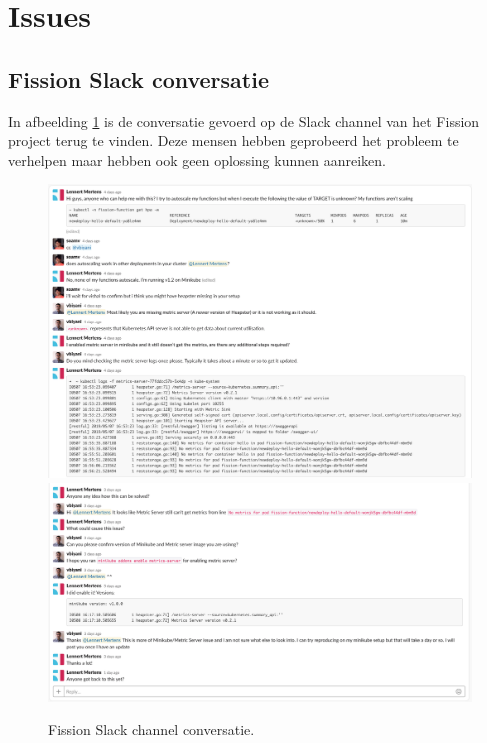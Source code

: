 \section{Issues}
\subsection{Fission Slack conversatie}
\label{sec:fission-slack-issue}
In afbeelding \ref{fig:fission-slack-issue-1} is de conversatie gevoerd op de Slack channel van het Fission project terug te vinden. Deze mensen hebben geprobeerd het probleem te verhelpen maar hebben ook geen oplossing kunnen aanreiken.
\begin{figure}
    \includegraphics[width=1\textwidth]{img/fission-slack-issue-1.png}
     \includegraphics[width=1\textwidth]{img/fission-slack-issue-2.png}
    \caption{Fission Slack channel conversatie.}
    \label{fig:fission-slack-issue-1}  
\end{figure}

